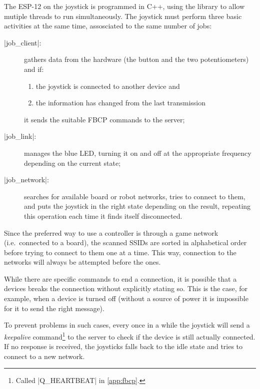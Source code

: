 \beforelist* The ESP-12 on the joystick is programmed in C++, using the
\ScheMo{} library to allow mutiple threads to run simultaneously.
The joystick must perform three basic activities at the same time, assosciated
to the same number of jobs:
\begin{description}
  \item[\Code|job\_client|:] gathers data from the hardware (the button and the
    two potentiometers) and if:
    \begin{enumerate}[itemjoin={,}, itemjoin*={{ and }}]
      \item the joystick is connected to another device and
      \item the information has changed from the last transmission
    \end{enumerate}
    it sends the suitable FBCP commands to the server;
  \item[\Code|job\_link|:] manages the blue LED, turning it on and off at the
    appropriate frequency depending on the current state;
  \item[\Code|job\_network|:] searches for available board or robot networks,
    tries to connect to them, and puts the joystick in the right state
    depending on the result, repeating this operation each time it finds itself
    disconnected.
\end{description}
\afterlist*
Since the preferred way to use a controller is through a game network
(i.e.\ connected to a board), the scanned SSIDs are sorted in alphabetical
order before trying to connect to them one at a time.
This way, connection to the  networks will always
be attempted before the  ones.

While there are specific commands to end a connection, it is possible that
a devices breaks the connection without explicitly stating so.
This is the case, for example, when a device is turned off (without a source of
power it is impossible for it to send the right message).

To prevent problems in such cases, every once in a while the joystick will send
a \emph{keepalive} command\footnote{Called \Code|Q\_HEARTBEAT| in
\autoref{app:fbcp}.} to the server to check if the device is still actually
connected.
If no response is received, the joysticks falls back to the idle state and tries
to connect to a new network.
